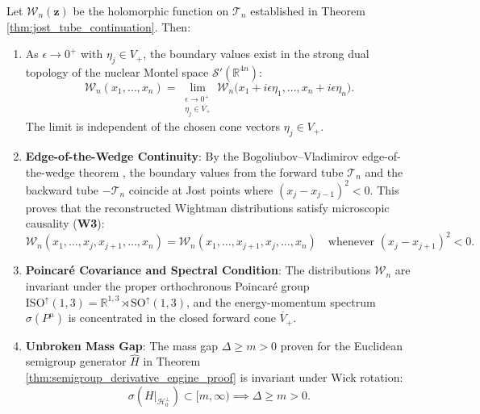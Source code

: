 \begin{theorem}
\label{thm:wightman_recovery}
Let $\mathcal{W}_n(\mathbf{z})$ be the holomorphic function on $\mathcal{T}_n$ established in Theorem \ref{thm:jost_tube_continuation}. Then:
\begin{enumerate}
    \item As $\epsilon \to 0^+$ with $\eta_j \in V_+$, the boundary values exist in the strong dual topology of the nuclear Montel space $\mathcal{S}'(\mathbb{R}^{4n})$:
    \begin{equation}
    \label{eq:wightman_boundary_limit}
    \mathcal{W}_n(x_1, \dots, x_n) = \lim_{\substack{\epsilon \to 0^+ \\ \eta_j \in V_+}} \mathcal{W}_n\bigl( x_1 + i \epsilon \eta_1, \dots, x_n + i \epsilon \eta_n \bigr).
    \end{equation}
    The limit is independent of the chosen cone vectors $\eta_j \in V_+$.

    \item \textbf{Edge-of-the-Wedge Continuity}: By the Bogoliubov--Vladimirov edge-of-the-wedge theorem \cite{StreaterWightman1964}, the boundary values from the forward tube $\mathcal{T}_n$ and the backward tube $-\mathcal{T}_n$ coincide at Jost points where $(x_j - x_{j-1})^2 < 0$. This proves that the reconstructed Wightman distributions satisfy microscopic causality (\textbf{W3}):
    \begin{equation}
    \label{eq:w3_microscopic_causality}
    \mathcal{W}_n(x_1, \dots, x_j, x_{j+1}, \dots, x_n) = \mathcal{W}_n(x_1, \dots, x_{j+1}, x_j, \dots, x_n) \quad \text{whenever } (x_j - x_{j+1})^2 < 0.
    \end{equation}

    \item \textbf{Poincar\'e Covariance and Spectral Condition}: The distributions $\mathcal{W}_n$ are invariant under the proper orthochronous Poincar\'e group $\mathrm{ISO}^\uparrow(1, 3) = \mathbb{R}^{1,3} \rtimes \mathrm{SO}^\uparrow(1, 3)$, and the energy-momentum spectrum $\sigma(P^\mu)$ is concentrated in the closed forward cone $\overline{V}_+$.

    \item \textbf{Unbroken Mass Gap}: The mass gap $\Delta \ge m > 0$ proven for the Euclidean semigroup generator $\hat{H}$ in Theorem \ref{thm:semigroup_derivative_engine_proof} is invariant under Wick rotation:
    \begin{equation}
    \sigma(H|_{\mathcal{H}_0^\perp}) \subset [m, \infty) \implies \Delta \ge m > 0.
    \end{equation}
\end{enumerate}
\end{theorem}

